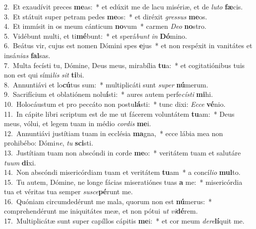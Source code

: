 {2.~}Et exaudívit preces \textbf{me}as:~* et edúxit me de lacu misériæ, et de \textit{lu}\textit{to} \textbf{fæ}cis.\\
{3.~}Et státuit super petram pedes \textbf{me}os:~* et diréxit \textit{gres}\textit{sus} \textbf{me}os.\\
{4.~}Et immísit in os meum cánticum \textbf{no}vum~* carmen \textit{De}\textit{o} \textbf{no}stro.\\
{5.~}Vidébunt multi, et ti\textbf{mé}bunt:~* et sperá\textit{bunt} \textit{in} \textbf{Dó}mino.\\
{6.~}Beátus vir, cujus est nomen Dómini spes \textbf{e}jus~* et non respéxit in vanitátes et insá\textit{ni}\textit{as} \textbf{fal}sas.\\
{7.~}Multa fecísti tu, Dómine, Deus meus, mirabília \textbf{tu}a:~* et cogitatiónibus tuis non est qui sími\textit{lis} \textit{sit} \textbf{ti}bi.\\
{8.~}Annuntiávi et lo\textbf{cú}tus sum:~* multiplicáti sunt \textit{su}\textit{per} \textbf{nú}merum.\\
{9.~}Sacrifícium et oblatiónem nolu\textbf{í}sti:~* aures autem perfe\textit{cí}\textit{sti} \textbf{mi}hi.\\
{10.~}Holocáustum et pro peccáto non postu\textbf{lá}sti:~* tunc dixi: \textit{Ec}\textit{ce} \textbf{vé}nio.\\
{11.~}In cápite libri scriptum est de me ut fácerem voluntátem \textbf{tu}am:~* Deus meus, vólui, et legem tuam in médio \textit{cor}\textit{dis} \textbf{me}i.\\
{12.~}Annuntiávi justítiam tuam in ecclésia \textbf{ma}gna,~* ecce lábia mea non prohibébo: Dómi\textit{ne}, \textit{tu} \textbf{sci}sti.\\
{13.~}Justítiam tuam non abscóndi in corde \textbf{me}o:~* veritátem tuam et salutáre \textit{tu}\textit{um} \textbf{di}xi.\\
{14.~}Non abscóndi misericórdiam tuam et veritátem \textbf{tu}am~* a concí\textit{li}\textit{o} \textbf{mul}to.\\
{15.~}Tu autem, Dómine, ne longe fácias miseratiónes tuas \textbf{a} me:~* misericórdia tua et véritas tua semper \textit{su}\textit{sce}\textbf{pé}runt me.\\
{16.~}Quóniam circumdedérunt me mala, quorum non est \textbf{nú}merus:~* comprehendérunt me iniquitátes meæ, et non pótui \textit{ut} \textit{vi}\textbf{dé}rem.\\
{17.~}Multiplicátæ sunt super capíllos cápitis \textbf{me}i:~* et cor meum \textit{de}\textit{re}\textbf{lí}quit me.\\
